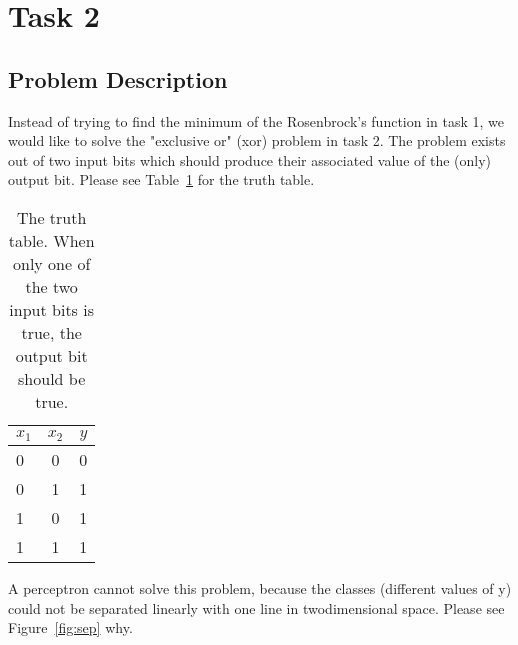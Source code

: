\documentclass{article}
\begin{document}
\pagestyle{empty}

\def\layersep{3.5cm}

\section{Task 2}


\subsection{Problem Description}
Instead of trying to find the minimum of the Rosenbrock's function in task 1, we would like to solve the "exclusive or" (xor) problem in task 2. The problem exists out of two input bits which should produce their associated value of the (only) output bit. Please see Table~\ref{tab:tt} for the truth table.

\begin{table}[!h]
	\centering
	\begin{tabular}{| l | c | r |}
		\hline
		$x_1$ & $x_2$ & $y$ \\ \hline
		0 & 0 & 0 \\ \hline
		0 & 1 & 1 \\ \hline
		1 & 0 & 1 \\ \hline
		1 & 1 & 1 \\ \hline
	\end{tabular}
	\caption{The truth table. When only one of the two input bits is true, the output bit should be true.}
	\label{tab:tt}
\end{table}

A perceptron cannot solve this problem, because the classes (different values of y) could not be separated linearly with one line in twodimensional space. Please see Figure~\ref{fig:sep} why. 
\end{document}
